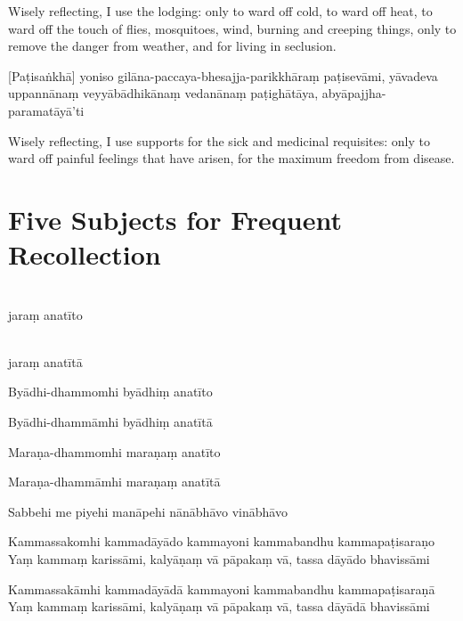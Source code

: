 \begin{english}
  Wisely reflecting, I use the lodging: only to ward off cold, to ward off heat,
  to ward off the touch of flies, mosquitoes, wind, burning and creeping things,
  only to remove the danger from weather, and for living in seclusion.
\end{english}

[Paṭisaṅkhā] yoniso gilāna-paccaya-bhesajja-parikkhāraṃ paṭisevāmi, yāvadeva
uppannānaṃ veyyābādhikānaṃ vedanānaṃ paṭighātāya, abyāpajjha-paramatāyā'ti

\begin{english}
  Wisely reflecting, I use supports for the sick and medicinal requisites: only
  to ward off painful feelings that have arisen, for the maximum freedom from
  disease.
\end{english}


\section{Five Subjects for Frequent Recollection}

\begin{leader}
\end{leader}


\\ jaraṃ anatīto

\\ jaraṃ anatītā

%
Byādhi-dhammomhi byādhiṃ anatīto

%
Byādhi-dhammāmhi byādhiṃ anatītā

%
Maraṇa-dhammomhi maraṇaṃ anatīto

%
Maraṇa-dhammāmhi maraṇaṃ anatītā

Sabbehi me piyehi manāpehi nānābhāvo vinābhāvo

%
Kammassakomhi kammadāyādo kammayoni kammabandhu kammapaṭisaraṇo\\
Yaṃ kammaṃ karissāmi, kalyāṇaṃ vā pāpakaṃ vā, tassa dāyādo bhavissāmi

%
Kammassakāmhi kammadāyādā kammayoni kammabandhu kammapaṭisaraṇā\\
Yaṃ kammaṃ karissāmi, kalyāṇaṃ vā pāpakaṃ vā, tassa dāyādā bhavissāmi

